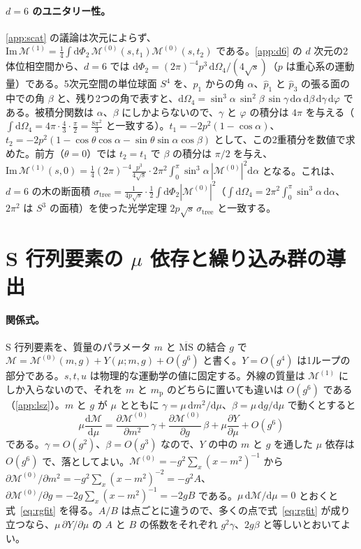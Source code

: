 \documentclass[a4paper,10pt]{ltjsarticle}
\newcommand{\dd}{\mathrm{d}}
\begin{document}
\paragraph{$d=6$ のユニタリー性。}\ref{app:scat} の議論は次元によらず、$\mathrm{Im}\,\mathcal{M}^{(1)}=\frac14\int\dd\Phi_2\,\mathcal{M}^{(0)}(s,t_1)\mathcal{M}^{(0)}(s,t_2)$ である。\ref{app:d6} の $d$ 次元の2体位相空間から、$d=6$ では $\dd\Phi_2=(2\pi)^{-4}p^3\,\dd\Omega_4/(4\sqrt s)$（$p$ は重心系の運動量）である。5次元空間の単位球面 $S^4$ を、$\hat p_1$ からの角 $\alpha$、$\hat p_1$ と $\hat p_3$ の張る面の中での角 $\beta$ と、残り2つの角で表すと、$\dd\Omega_4=\sin^3\alpha\,\sin^2\beta\,\sin\gamma\,\dd\alpha\,\dd\beta\,\dd\gamma\,\dd\varphi$ である。被積分関数は $\alpha$、$\beta$ にしかよらないので、$\gamma$ と $\varphi$ の積分は $4\pi$ を与える（$\int\dd\Omega_4=4\pi\cdot\frac43\cdot\frac\pi2=\frac{8\pi^2}3$ と一致する）。$t_1=-2p^2(1-\cos\alpha)$、$t_2=-2p^2(1-\cos\theta\cos\alpha-\sin\theta\sin\alpha\cos\beta)$ として、この2重積分を数値で求めた。前方（$\theta=0$）では $t_2=t_1$ で $\beta$ の積分は $\pi/2$ を与え、$\mathrm{Im}\,\mathcal{M}^{(1)}(s,0)=\frac14(2\pi)^{-4}\frac{p^3}{4\sqrt s}\cdot2\pi^2\int_0^\pi\sin^3\alpha\,|\mathcal{M}^{(0)}|^2\dd\alpha$ となる。これは、$d=6$ の木の断面積 $\sigma_{\mathrm{tree}}=\frac{1}{4p\sqrt s}\cdot\frac12\int\dd\Phi_2|\mathcal{M}^{(0)}|^2$（$\int\dd\Omega_4=2\pi^2\int_0^\pi\sin^3\alpha\,\dd\alpha$、$2\pi^2$ は $S^3$ の面積）を使った光学定理 $2p\sqrt s\,\sigma_{\mathrm{tree}}$ と一致する。

\section{S 行列要素の $\mu$ 依存と繰り込み群の導出}\label{app:rg}

\paragraph{関係式。}S 行列要素を、質量のパラメータ $m$ と $\overline{\mathrm{MS}}$ の結合 $g$ で $\mathcal{M}=\mathcal{M}^{(0)}(m,g)+Y(\mu;m,g)+O(g^6)$ と書く。$Y=O(g^4)$ は1ループの部分である。$s,t,u$ は物理的な運動学の値に固定する。外線の質量は $\mathcal{M}^{(1)}$ にしか入らないので、それを $m$ と $m_{\mathrm p}$ のどちらに置いても違いは $O(g^6)$ である（\ref{app:lsz}）。$m$ と $g$ が $\mu$ とともに $\gamma=\mu\,\dd m^2/\dd\mu$、$\beta=\mu\,\dd g/\dd\mu$ で動くとすると
\begin{equation*}
\mu\frac{\dd\mathcal{M}}{\dd\mu}=\frac{\partial\mathcal{M}^{(0)}}{\partial m^2}\,\gamma+\frac{\partial\mathcal{M}^{(0)}}{\partial g}\,\beta+\mu\frac{\partial Y}{\partial\mu}+O(g^6)
\end{equation*}
である。$\gamma=O(g^2)$、$\beta=O(g^3)$ なので、$Y$ の中の $m$ と $g$ を通した $\mu$ 依存は $O(g^6)$ で、落としてよい。$\mathcal{M}^{(0)}=-g^2\sum_x(x-m^2)^{-1}$ から $\partial\mathcal{M}^{(0)}/\partial m^2=-g^2\sum_x(x-m^2)^{-2}=-g^2A$、$\partial\mathcal{M}^{(0)}/\partial g=-2g\sum_x(x-m^2)^{-1}=-2gB$ である。$\mu\,\dd\mathcal{M}/\dd\mu=0$ とおくと式~\eqref{eq:rgfit} を得る。$A/B$ は点ごとに違うので、多くの点で式~\eqref{eq:rgfit} が成り立つなら、$\mu\,\partial Y/\partial\mu$ の $A$ と $B$ の係数をそれぞれ $g^2\gamma$、$2g\beta$ と等しいとおいてよい。
\end{document}
